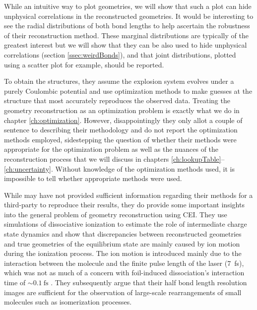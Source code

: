 While an intuitive way to plot geometries, we will show that such a plot can hide unphysical correlations in the reconstructed geometries. It would be interesting to see the radial distributions of both bond lengths to help ascertain the robustness of their reconstruction method. These marginal distributions are typically of the greatest interest but we will show that they can be also used to hide unphysical correlations (section \ref{ssec:weirdBonds}), and that joint distributions, plotted using a scatter plot for example, should be reported.

To obtain the structures, they assume the explosion system evolves under a purely Coulombic potential and use optimization methods to make guesses at the structure that most accurately reproduces the observed data. Treating the geometry reconstruction as an optimization problem is exactly what we do in chapter \ref{ch:optimization}. However, disappointingly they only allot a couple of sentence to describing their methodology and do not report the optimization methods employed, sidestepping the question of whether their methods were appropriate for the optimization problem as well as the nuances of the reconstruction process that we will discuss in chapters \ref{ch:lookupTable}--\ref{ch:uncertainty}. Without knowledge of the optimization methods used, it is impossible to tell whether appropriate methods were used.

While \citet{Legare05structure} may have not provided sufficient information regarding their methods for a third-party to reproduce their results, they do provide some important insights into the general problem of geometry reconstruction using CEI. They use simulations of dissociative ionization to estimate the role of intermediate charge state dynamics and show that discrepancies between reconstructed geometries and true geometries of the equilibrium state are mainly caused by ion motion during the ionization process. The ion motion is introduced mainly due to the interaction between the molecule and the finite pulse length of the laser (\SI{7}{\femto\s}), which was not as much of a concern with foil-induced dissociation's interaction time of $\sim\SI{0.1}{\fs}$ \citep{Vager89}. They subsequently argue that their half bond length resolution images are sufficient for the observation of large-scale rearrangements of small molecules such as isomerization processes.


